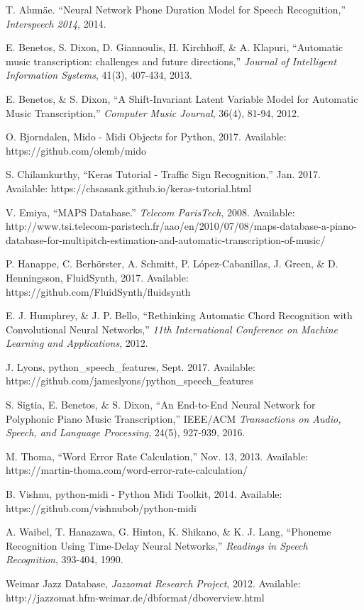 \documentclass[conference]{IEEEtran}
\begin{document}
\begin{thebibliography}{99} %

T. Alum\"ae. ``Neural Network Phone Duration Model for Speech Recognition,'' \textit{Interspeech 2014}, 2014.

E. Benetos, S. Dixon, D. Giannoulis, H. Kirchhoff, \& A. Klapuri, ``Automatic music transcription: challenges and future directions,'' \textit{Journal of Intelligent Information Systems}, 41(3), 407-434, 2013.

E. Benetos, \& S. Dixon, ``A Shift-Invariant Latent Variable Model for Automatic Music Transcription,'' \textit{Computer Music Journal}, 36(4), 81-94, 2012.

O. Bjorndalen, Mido - Midi Objects for Python, 2017. Available: https://github.com/olemb/mido

S. Chilamkurthy, ``Keras Tutorial - Traffic Sign Recognition,'' Jan. 2017. Available: https://chsasank.github.io/keras-tutorial.html

V. Emiya, ``MAPS Database.'' \textit{Telecom ParisTech}, 2008. Available: http://www.tsi.telecom-paristech.fr/aao/en/2010/07/08/maps-database-a-piano-database-for-multipitch-estimation-and-automatic-transcription-of-music/

P. Hanappe, C. Berhörster, A. Schmitt, P. López-Cabanillas, J. Green, \& D. Henningsson, FluidSynth, 2017. Available: https://github.com/FluidSynth/fluidsynth

E. J. Humphrey, \& J. P. Bello, ``Rethinking Automatic Chord Recognition with Convolutional Neural Networks,'' \textit{11th International Conference on Machine Learning and Applications}, 2012.

J. Lyons, python\_speech\_features, Sept. 2017. Available: https://github.com/jameslyons/python\_speech\_features

S. Sigtia, E. Benetos, \& S. Dixon, ``An End-to-End Neural Network for Polyphonic Piano Music Transcription,'' IEEE/ACM \textit{Transactions on Audio, Speech, and Language Processing}, 24(5), 927-939, 2016.

M. Thoma, ``Word Error Rate Calculation,'' Nov. 13, 2013. Available: https://martin-thoma.com/word-error-rate-calculation/

B. Vishnu, python-midi - Python Midi Toolkit, 2014. Available: https://github.com/vishnubob/python-midi

A. Waibel, T. Hanazawa, G. Hinton, K. Shikano, \& K. J. Lang, ``Phoneme Recognition Using Time-Delay Neural Networks,'' \textit{Readings in Speech Recognition}, 393-404, 1990.
 
Weimar Jazz Database, \textit{Jazzomat Research Project}, 2012. Available: http://jazzomat.hfm-weimar.de/dbformat/dboverview.html 

\end{thebibliography}
\end{document}
